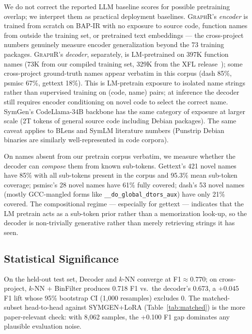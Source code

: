 \documentclass[sigconf,nonacm]{acmart}
\newcommand{\sysname}{\textsc{GraphR}}
\begin{document}
We do not correct the reported LLM baseline scores for possible pretraining overlap; we interpret them as practical deployment baselines. \sysname{}'s \emph{encoder} is trained from scratch on BAP-IR with no exposure to source code, function names from outside the training set, or pretrained text embeddings --- the cross-project numbers genuinely measure encoder generalization beyond the 73 training packages. \sysname{}'s \emph{decoder}, separately, is LM-pretrained on 397K function names (73K from our compiled training set, 329K from the XFL release~\cite{xfl}); some cross-project ground-truth names appear verbatim in this corpus (dash 85\%, psmisc 67\%, gettext 18\%). This is LM-pretrain exposure to isolated name strings rather than supervised training on (code, name) pairs; at inference the decoder still requires encoder conditioning on novel code to select the correct name. SymGen's CodeLlama-34B backbone has the same category of exposure at larger scale (2T tokens of general source code including Debian packages). The same caveat applies to BLens and SymLM literature numbers (Punstrip Debian binaries are similarly well-represented in code corpora).

On names absent from our pretrain corpus verbatim, we measure whether the decoder can \emph{compose} them from known sub-tokens. Gettext's 421 novel names have 85\% with all sub-tokens present in the corpus and 95.3\% mean sub-token coverage; psmisc's 28 novel names have 61\% fully covered; dash's 53 novel names (mostly GCC-mangled forms like \texttt{\_\_do\_global\_dtors\_aux}) have only 21\% covered. The compositional regime --- especially for gettext --- indicates that the LM pretrain acts as a sub-token prior rather than a memorization look-up, so the decoder is non-trivially generative rather than merely retrieving strings it has seen.

\subsection{Statistical Significance}

On the held-out test set, Decoder and $k$-NN converge at F1${\approx}0.770$; on cross-project, $k$-NN + BinFilter produces 0.718 F1 vs.\ the decoder's 0.673, a +0.045 F1 lift whose 95\% bootstrap CI (1{,}000 resamples) excludes 0. The matched-subset head-to-head against SYMGEN+LoRA (Table~\ref{tab:matched}) is the more paper-relevant check: with 8{,}062 samples, the +0.100 F1 gap dominates any plausible evaluation noise.
\end{document}
